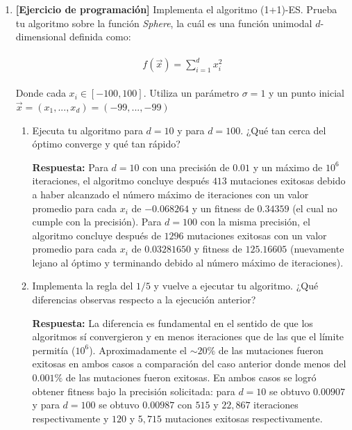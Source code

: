 \documentclass[10pt,letterpaper]{article}
\begin{document}
\begin{enumerate}
    \clearpage
    \item \textbf{[Ejercicio de programación]} Implementa el algoritmo (1+1)-ES. Prueba
          tu algoritmo sobre la función \textit{Sphere}, la cuál es una función unimodal
          $d$-dimensional definida como:

        \begin{equation*} \begin{split} \begin{gathered}
            f(\vec{x}) = \sum_{i=1}^d x_i^2
        \end{gathered} \end{split} \end{equation*}

        Donde cada $x_i \in [-100, 100]$. Utiliza un parámetro $\sigma = 1$ y un punto
        inicial $\vec{x} = (x_1, ..., x_d) = (-99,...,-99)$

        \begin{enumerate}
            \item Ejecuta tu algoritmo para $d=10$ y para $d=100$. ¿Qué tan cerca del óptimo
            converge y qué tan rápido?

            \textbf{Respuesta:} Para $d=10$ con una precisión de $0.01$ y un máximo de $10^6$ iteraciones,
            el algoritmo concluye después $413$ mutaciones exitosas debido a haber alcanzado el número
            máximo de iteraciones con un valor promedio para cada $x_i$ de $-0.068264$
            y un fitness de $0.34359$ (el cual no cumple con la precisión).
            Para $d=100$ con la misma precisión, el algoritmo concluye después de $1296$
            mutaciones exitosas con un valor promedio para cada $x_i$ de $0.03281650$ y fitness de
            $125.16605$ (nuevamente lejano al óptimo y terminando debido al número máximo de iteraciones).

            \item Implementa la regla del $1/5$ y vuelve a ejecutar tu algoritmo. ¿Qué diferencias
            observas respecto a la ejecución anterior?

            \textbf{Respuesta:} La diferencia es fundamental en el sentido de que los algoritmos sí
            convergieron y en menos iteraciones que de las que el límite permitía ($10^6$). Aproximadamente
            el $\sim 20\%$ de las mutaciones fueron exitosas en ambos casos a comparación del caso
            anterior donde menos del $0.001\%$ de las mutaciones fueron exitosas. En ambos casos se
            logró obtener fitness bajo la precisión solicitada: para $d=10$ se obtuvo $0.00907$ y para
            $d=100$ se obtuvo $0.00987$ con $515$ y $22,867$ iteraciones respectivamente y $120$ y $5,715$
            mutaciones exitosas respectivamente.
        \end{enumerate}


\end{enumerate}
\end{document}
